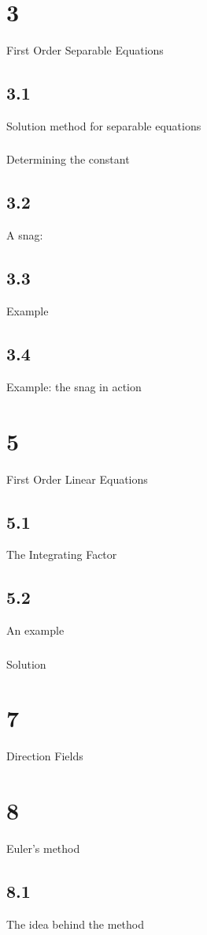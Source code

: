 \section{3}{First Order Separable Equations}
\subsection{3.1}{Solution method for separable equations}
\subsubsection{}{Determining the constant}
\subsection{3.2}{A snag: }
\subsection{3.3}{Example}
\subsection{3.4}{Example: the snag in action}

\section{5}{First Order Linear Equations}
\subsection{5.1}{The Integrating Factor}
\subsection{5.2}{An example}
\subsubsection{}{Solution}

\section{7}{Direction Fields}
\section{8}{Euler's method}
\subsection{8.1}{The idea behind the method}

